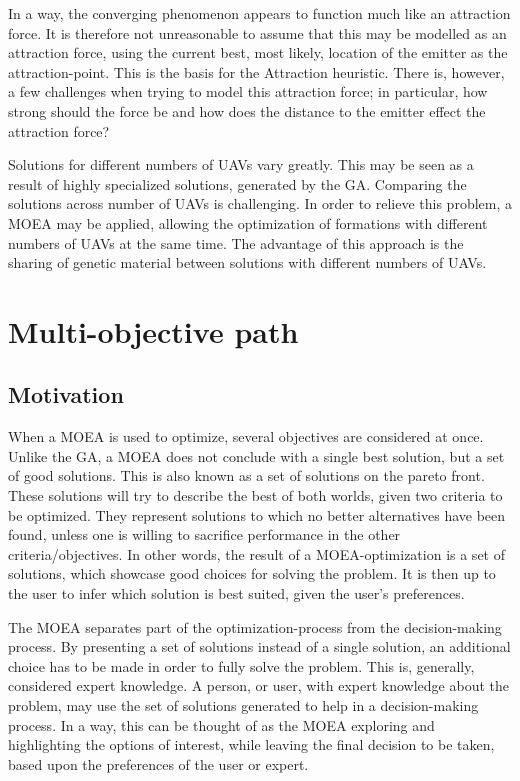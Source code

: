 \documentclass[10pt,a4paper]{book}
\begin{document}
In a way, the converging phenomenon appears to function much like an attraction force. It is therefore not unreasonable to assume that this may be modelled as an attraction force, using the current best, most likely, location of the emitter as the attraction-point. This is the basis for the Attraction heuristic. There is, however, a few challenges when trying to model this attraction force; in particular, how strong should the force be and how does the distance to the emitter effect the attraction force?

Solutions for different numbers of \glspl{UAV} vary greatly. This may be seen as a result of highly specialized solutions, generated by the \gls{GA}. Comparing the solutions across number of \glspl{UAV} is challenging. In order to relieve this problem, a \gls{MOEA} may be applied, allowing the optimization of formations with different numbers of \glspl{UAV} at the same time. The advantage of this approach is the sharing of genetic material between solutions with different numbers of \glspl{UAV}.


\newpage

\section{Multi-objective path}

\subsection{Motivation}

When a \gls{MOEA} is used to optimize, several objectives are considered at once. Unlike the \gls{GA}, a \gls{MOEA} does not conclude with a single best solution, but a set of good solutions. This is also known as a set of solutions on the pareto front. These solutions will try to describe the best of both worlds, given two criteria to be optimized. They represent solutions to which no better alternatives have been found, unless one is willing to sacrifice performance in the other criteria/objectives. In other words, the result of a \gls{MOEA}-optimization is a set of solutions, which showcase good choices for solving the problem. It is then up to the user to infer which solution is best suited, given the user's preferences.

The \gls{MOEA} separates part of the optimization-process from the decision-making process. By presenting a set of solutions instead of a single solution, an additional choice has to be made in order to fully solve the problem. This is, generally, considered expert knowledge. A person, or user, with expert knowledge about the problem, may use the set of solutions generated to help in a decision-making process. In a way, this can be thought of as the \gls{MOEA} exploring and highlighting the options of interest, while leaving the final decision to be taken, based upon the preferences of the user or expert.
\end{document}
